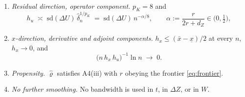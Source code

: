 \begin{assumption}\label{ass:app5}~
\begin{enumerate}
\item[(i)] \emph{Residual direction, operator component.} $p_K=8$ and
\[
h_u\;\asymp\;\mathrm{sd}(\Delta U)\,\hat\delta_n^{1/p_K}\;=\;\mathrm{sd}(\Delta U)\,n^{-\alpha/8},
\qquad \alpha:=\frac{r}{2r+d_Z}\in\big(0,\tfrac12\big),
\]
\item[(ii)] \emph{$x$-direction, derivative and adjoint components.} $h_x\le(\bar x-\underline x)/2$ at
every $n$, $h_x\to0$, and
\[
\big(n\,h_x\,h_u\big)^{-1}\ln n\;\longrightarrow\;0 .
\]
\item[(iii)] \emph{Propensity.} $\hat\varrho$ satisfies A4(iii) with $r$ obeying the
frontier \eqref{eq:frontier}.
\item[(iv)] \emph{No further smoothing.} No bandwidth is used in $t$, in $\Delta Z$, or in $W$.
\end{enumerate}
\end{assumption}

